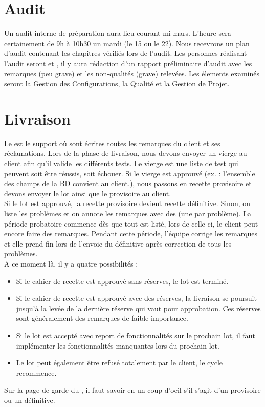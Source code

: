 \documentclass [a4paper] {article}
\begin{document}
\section{Audit}
Un audit interne de préparation aura lieu courant mi-mars. L'heure sera certainement de 9h à 10h30 un mardi (le 15 ou le 22). Nous recevrons un plan d'audit contenant les chapitres vérifiés lors de l'audit. Les personnes réalisant l'audit seront \nomTuteurQualite{} et \nomApprobateur{}, il y aura rédaction d'un rapport préliminaire d'audit avec les remarques (peu grave) et les non-qualités (grave) relevées. Les élements examinés seront la Gestion des Configurations, la Qualité et la Gestion de Projet.


\section{Livraison}
Le \CDR{} est le support où sont écrites toutes les remarques du client et ses réclamations. Lors de la phase de livraison, nous devons envoyer un \CDR{} vierge au client afin qu'il valide les différents tests. Le \CDR{} vierge est une liste de test qui peuvent soit être réussis, soit échouer. Si le \CDR{} vierge est approuvé (ex. : l'ensemble des champs de la BD convient au client.), nous passons en recette provisoire et devons envoyer le lot ainsi que le \CDR{} provisoire au client.\\
Si le lot est approuvé, la recette provisoire devient recette définitive. Sinon, on liste les problèmes et on annote les remarques avec des \FFT{} (une \FFTCourt{} par problème). La période probatoire commence dès que tout est listé, lors de celle ci, le client peut encore faire des remarques. Pendant cette période, l'équipe corrige les remarques et elle prend fin lors de l'envoie du \CDR{} définitive après correction de tous les problèmes.\\
A ce moment là, il y a quatre possibilités :
\begin{itemize}
\item Si le cahier de recette est approuvé sans réserves, le lot est terminé.
\item Si le cahier de recette est approuvé avec des réserves, la livraison se poursuit jusqu'à la levée de la dernière réserve qui vaut pour approbation. Ces réserves sont généralement des remarques de faible importance.
\item Si le lot est accepté avec report de fonctionnalités sur le prochain lot, il faut implémenter les fonctionnalités manquantes lors du prochain lot.
\item Le lot peut également être refusé totalement par le client, le cycle recommence.
\end{itemize}
Sur la page de garde du \CDR{}, il faut savoir en un coup d'oeil s'il s'agit d'un \CDR{} provisoire ou un \CDR{} définitive.
\end{document}
